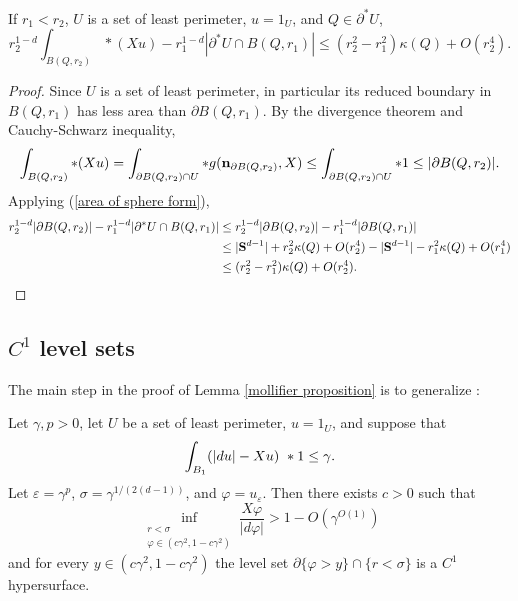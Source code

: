 \begin{lemma}\label{scalar curvature monotonicity}
If $r_1 < r_2$, $U$ is a set of least perimeter, $u = 1_U$, and $Q \in \partial^* U$,
$$r_2^{1 - d}\int_{B(Q, r_2)} *(Xu) - r_1^{1 - d}|\partial^* U \cap B(Q, r_1)| \leq (r_2^2 - r_1^2)\kappa(Q) + O(r_2^4).$$
\end{lemma}
\begin{proof}
Since $U$ is a set of least perimeter, in particular its reduced boundary in $B(Q, r_1)$ has less area than $\partial B(Q, r_1)$.
By the divergence theorem and Cauchy-Schwarz inequality,
$$\int_{B(Q, r_2)} *(Xu) = \int_{\partial B(Q, r_2) \cap U} *g(\mathbf n_{\partial B(Q, r_2)}, X) \leq \int_{\partial B(Q, r_2) \cap U} *1 \leq |\partial B(Q, r_2)|.$$
Applying (\ref{area of sphere form}),
\begin{align*}
r_2^{1 - d}|\partial B(Q, r_2)| - r_1^{1 - d}|\partial^* U \cap B(Q, r_1)|
&\leq r_2^{1 - d}|\partial B(Q, r_2)| - r_1^{1 - d}|\partial B(Q, r_1)| \\
&\leq |\mathbf S^{d - 1}| + r_2^2\kappa(Q) + O(r_2^4) - |\mathbf S^{d - 1}| - r_1^2 \kappa(Q) + O(r_1^4)\\
&\leq (r_2^2 - r_1^2)\kappa(Q) + O(r_2^4).\qedhere
\end{align*}
\end{proof}



\subsection{\texorpdfstring{$C^1$}{C1} level sets}
The main step in the proof of Lemma \ref{mollifier proposition} is to generalize \cite[Theorem 7.3, Remark 7.4]{Giusti77}:

\begin{lemma}\label{main mollifier lemma}
Let $\gamma, p > 0$, let $U$ be a set of least perimeter, $u = 1_U$, and suppose that
\begin{equation}\label{hypothesis on main mollifier lemma}
\int_{B_1} (|du| - Xu) ~*1 \leq \gamma.
\end{equation}
Let $\varepsilon = \gamma^p$, $\sigma = \gamma^{1/(2(d - 1))}$, and $\varphi = u_\varepsilon$. Then there exists $c > 0$ such that
\begin{equation}\label{claim on main mollifier lemma}
\inf_{\substack{r < \sigma\\\varphi \in (c\gamma^2, 1 - c\gamma^2)}} \frac{X \varphi}{|d\varphi|} > 1 - O(\gamma^{O(1)})
\end{equation}
and for every $y \in (c\gamma^2, 1 - c\gamma^2)$ the level set $\partial \{\varphi > y\} \cap \{r < \sigma\}$ is a $C^1$ hypersurface.
\end{lemma}

